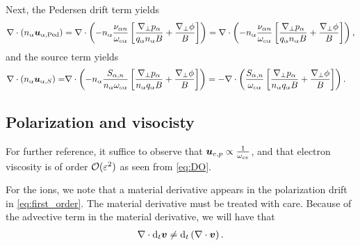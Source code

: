 Next, the Pedersen drift term yields
%
\begin{align*}
    \nabla\cdot\left(n_\alpha \boldsymbol{u}_{\alpha,\text{Ped}}\right)
    =
    \nabla\cdot\left(
    - n_\alpha \frac{\nu_{\alpha n} }{\omega_{c\alpha}}
    \left[\frac{\nabla_\perp p_\alpha}{q_\alpha n_\alpha B}
    + \frac{\nabla_\perp \phi}{B} \right]
    \right)
    =
    \nabla\cdot\left(
    - n_\alpha \frac{\nu_{\alpha n} }{\omega_{c\alpha}}
    \left[\frac{\nabla_\perp p_\alpha}{q_\alpha n_\alpha B}
    + \frac{\nabla_\perp \phi}{B} \right]
    \right)
    ,
\end{align*}
%
and the source term yields
%
\begin{align*}
    \nabla\cdot\left(n_\alpha \boldsymbol{u}_{\alpha,S}\right)
    =&
    \nabla\cdot\left(
    - n_\alpha
  \frac{ S_{\alpha,n}}{n_\alpha \omega_{c\alpha}}
  \left[
  \frac{\nabla_\perp p_\alpha}{n_\alpha  q_\alpha B}
  + \frac{\nabla_\perp \phi}{B}
  \right]    \right)
  =
  -
  \nabla\cdot\left(
  \frac{ S_{\alpha,n}}{\omega_{c\alpha}}
  \left[
  \frac{\nabla_\perp p_\alpha}{n_\alpha  q_\alpha B}
  + \frac{\nabla_\perp \phi}{B}
  \right]    \right).
\end{align*}
%

\subsection{Polarization and visocisty}
\label{sec:gyrovisc}
%
For further reference, it suffice to observe that $\boldsymbol{u}_{e,p}\propto\frac{1}{\omega_{ce}}$, and that electron viscosity is of order $\mathcal{O}(\varepsilon^2)$ as seen from \cref{eq:DO}.

For the ions, we note that a material derivative appears in the polarization drift in \cref{eq:first_order}.
The material derivative must be treated with care.
Because of the advective term in the material derivative, we will have that
%
\begin{align*}
    \nabla\cdot \text{d}_t \boldsymbol{v} \neq  \text{d}_t \left(\nabla\cdot \boldsymbol{v}\right).
\end{align*}
%

